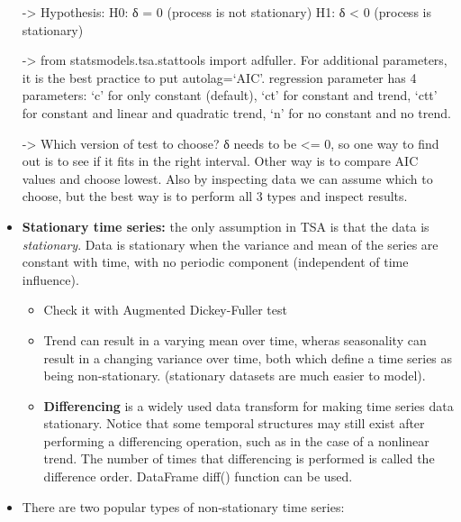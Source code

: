 \documentclass[
  letterpaper,
]{book}
\providecommand{\tightlist}{%
  \setlength{\itemsep}{0pt}\setlength{\parskip}{0pt}}\usepackage{longtable,booktabs,array}
\begin{document}
\begin{itemize}
  -\textgreater{} Hypothesis: H0: δ = 0 (process is not stationary) H1:
  δ \textless{} 0 (process is stationary)

  -\textgreater{} from statsmodels.tsa.stattools import adfuller. For
  additional parameters, it is the best practice to put autolag=`AIC'.
  regression parameter has 4 parameters: `c' for only constant
  (default), `ct' for constant and trend, `ctt' for constant and linear
  and quadratic trend, `n' for no constant and no trend.

  -\textgreater{} Which version of test to choose? δ needs to be
  \textless= 0, so one way to find out is to see if it fits in the right
  interval. Other way is to compare AIC values and choose lowest. Also
  by inspecting data we can assume which to choose, but the best way is
  to perform all 3 types and inspect results.
\item
  \textbf{Stationary time series:} the only assumption in TSA is that
  the data is \emph{stationary}. Data is stationary when the variance
  and mean of the series are constant with time, with no periodic
  component (independent of time influence).

  \begin{itemize}
  \tightlist
  \item
    Check it with Augmented Dickey-Fuller test
  \item
    Trend can result in a varying mean over time, wheras seasonality can
    result in a changing variance over time, both which define a time
    series as being non-stationary. (stationary datasets are much easier
    to model).
  \item
    \textbf{Differencing} is a widely used data transform for making
    time series data stationary. Notice that some temporal structures
    may still exist after performing a differencing operation, such as
    in the case of a nonlinear trend. The number of times that
    differencing is performed is called the difference order. DataFrame
    diff() function can be used.
  \end{itemize}
\item
  There are two popular types of non-stationary time series:


\end{itemize}
\end{document}
